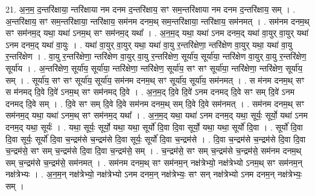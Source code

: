 \documentclass[17pt]{extarticle}
\begin{document}
21. अ॒न॒म॒ द॒न्तरि॑क्षाया॒ न्तरि॑क्षाया नम दनम द॒न्तरि॑क्षाय॒ सꣳ सम॒न्तरि॑क्षाया नम दनम द॒न्तरि॑क्षाय॒ सम् । . अ॒न्तरि॑क्षाय॒ सꣳ सम॒न्तरि॑क्षाया॒ न्तरि॑क्षाय॒ सम॑नम दनम॒थ् सम॒न्तरि॑क्षाया॒ न्तरि॑क्षाय॒ 
सम॑नमत् । . सम॑नम दनम॒थ् सꣳ सम॑नम॒द् यथा॒ यथा॑ ऽनम॒थ् सꣳ सम॑नम॒द् यथा᳚ । . अ॒न॒म॒द् यथा॒ यथा॑ ऽनम दनम॒द् यथा॑ वा॒युर् वा॒युर् यथा॑ ऽनम दनम॒द् यथा॑ वा॒युः । . यथा॑ वा॒युर् वा॒युर् यथा॒ यथा॑ वा॒यु र॒न्तरि॑क्षेणा॒ न्तरि॑क्षेण वा॒युर् यथा॒ यथा॑ वा॒यु र॒न्तरि॑क्षेण । . वा॒यु र॒न्तरि॑क्षेणा॒ न्तरि॑क्षेण वा॒युर् वा॒यु र॒न्तरि॑क्षेण॒ सूर्या॑य॒ सूर्या॑या॒ न्तरि॑क्षेण वा॒युर् वा॒यु र॒न्तरि॑क्षेण॒ सूर्या॑य । . अ॒न्तरि॑क्षेण॒ सूर्या॑य॒ सूर्या॑या॒ न्तरि॑क्षेणा॒ न्तरि॑क्षेण॒ सूर्या॑य॒ सꣳ सꣳ सूर्या॑या॒ न्तरि॑क्षेणा॒ न्तरि॑क्षेण॒ सूर्या॑य॒ सम् । . सूर्या॑य॒ सꣳ सꣳ सूर्या॑य॒ सूर्या॑य॒ सम॑नम दनम॒थ् सꣳ सूर्या॑य॒ सूर्या॑य॒ सम॑नमत् । . स म॑नम दनम॒थ् सꣳ स म॑नमद् दि॒वे दि॒वे॑ ऽनम॒थ् सꣳ सम॑नमद् दि॒वे । . अ॒न॒म॒द् दि॒वे दि॒वे॑ ऽनम दनमद् दि॒वे सꣳ सम् दि॒वे॑ ऽनम दनमद् दि॒वे सम् । . दि॒वे सꣳ सम् दि॒वे दि॒वे सम॑नम दनम॒थ् सम् दि॒वे दि॒वे सम॑नमत् । . सम॑नम दनम॒थ् सꣳ सम॑नम॒द् यथा॒ यथा॑ ऽनम॒थ् सꣳ सम॑नम॒द् यथा᳚ । . अ॒न॒म॒द् यथा॒ यथा॑ ऽनम दनम॒द् यथा॒ सूर्यः॒ सूर्यो॒ यथा॑ ऽनम दनम॒द् यथा॒ सूर्यः॑ । . यथा॒ सूर्यः॒ सूर्यो॒ यथा॒ यथा॒ सूर्यो॑ दि॒वा दि॒वा सूर्यो॒ यथा॒ यथा॒ सूर्यो॑ दि॒वा । . सूर्यो॑ दि॒वा दि॒वा सूर्यः॒ सूर्यो॑ दि॒वा च॒न्द्रम॑से च॒न्द्रम॑से दि॒वा सूर्यः॒ सूर्यो॑ दि॒वा च॒न्द्रम॑से । . दि॒वा च॒न्द्रम॑से च॒न्द्रम॑से दि॒वा दि॒वा च॒न्द्रम॑से॒ सꣳ सम् च॒न्द्रम॑से दि॒वा दि॒वा च॒न्द्रम॑से॒ सम् । . च॒न्द्रम॑से॒ सꣳ सम् च॒न्द्रम॑से च॒न्द्रम॑से॒ सम॑नम दनम॒थ् सम् च॒न्द्रम॑से च॒न्द्रम॑से॒ 
सम॑नमत् । . सम॑नम दनम॒थ् सꣳ सम॑नम॒न् नक्ष॑त्रेभ्यो॒ नक्ष॑त्रेभ्यो ऽनम॒थ् सꣳ सम॑नम॒न् नक्ष॑त्रेभ्यः । . अ॒न॒म॒न् नक्ष॑त्रेभ्यो॒ नक्ष॑त्रेभ्यो ऽनम दनम॒न् नक्ष॑त्रेभ्यः॒ सꣳ सन् नक्ष॑त्रेभ्यो ऽनम दनम॒न् नक्ष॑त्रेभ्यः॒ सम् । \newline
\end{document}
